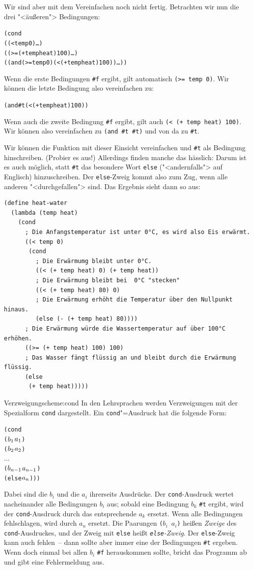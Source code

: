 Wir sind aber mit dem Vereinfachen noch nicht fertig. Betrachten wir
nun die drei "<äußeren"> Bedingungen:
%
\begin{alltt}
    (cond
      ((< temp 0) \ldots)
      ((>= (+ temp heat) 100) \ldots)
      ((and (>= temp 0) (< (+ temp heat) 100)) \ldots))
\end{alltt}
%
Wenn die erste Bedingungen \verb|#f| ergibt, gilt automatisch
\texttt{(>= temp 0)}.  Wir können die letzte Bedingung also
vereinfachen zu:
%
\begin{alltt}
(and #t (< (+ temp heat) 100))
\end{alltt}
%
Wenn auch die zweite Bedingung \verb|#f| ergibt, gilt auch \texttt{(<
  (+ temp heat) 100)}.  Wir können also vereinfachen zu \texttt{(and
  \#t \#t)} und von da zu \verb|#t|.

Wir können die Funktion mit dieser Einsicht vereinfachen und \verb|#t|
als Bedingung hinschreiben.  (Probier es aus!)  Allerdings finden
manche das hässlich: Darum ist es auch möglich, statt \verb|#t| das
besondere Wort \texttt{else}
("<andernfalls"> auf Englisch) hinzuschreiben.
Der \texttt{else}-Zweig kommt also zum Zug, wenn alle anderen
"<durchgefallen"> sind.  Das Ergebnis sieht
dann so aus:
%
\begin{verbatim}
(define heat-water
  (lambda (temp heat)
    (cond
      ; Die Anfangstemperatur ist unter 0°C, es wird also Eis erwärmt.
      ((< temp 0)
       (cond
         ; Die Erwärmumg bleibt unter 0°C.
         ((< (+ temp heat) 0) (+ temp heat))
         ; Die Erwärmung bleibt bei  0°C "stecken"
         ((< (+ temp heat) 80) 0)
         ; Die Erwärmung erhöht die Temperatur über den Nullpunkt hinaus.
         (else (- (+ temp heat) 80))))
      ; Die Erwärmung würde die Wassertemperatur auf über 100°C erhöhen.
      ((>= (+ temp heat) 100) 100)
      ; Das Wasser fängt flüssig an und bleibt durch die Erwärmung flüssig.
      (else
       (+ temp heat)))))
\end{verbatim}
%
\begin{feature}{Verzweigung}{scheme:cond}
In den Lehrsprachen werden Verzweigungen
mit der Spezialform \texttt{cond} dargestellt.
Ein \texttt{cond}"=Ausdruck hat die folgende Form:
%
\begin{alltt}
(cond
  (\(b\sb{1}\) \(a\sb{1}\))
  (\(b\sb{2}\) \(a\sb{2}\))
  \(\ldots\)
  (\(b\sb{n-1}\) \(a\sb{n-1}\))
  (else \(a\sb{n}\))))
\end{alltt}
%
Dabei sind die $b_i$ und die $a_i$ ihrerseits Ausdrücke.  Der
\texttt{cond}-Ausdruck wertet nacheinander alle Bedingungen $b_i$ aus;
sobald eine Bedingung $b_k$ \texttt{\#t} ergibt, wird der
\texttt{cond}-Ausdruck durch das entsprechende $a_k$ ersetzt.  Wenn
alle Bedingungen fehlschlagen, wird durch $a_n$ ersetzt.  Die Paarungen
\texttt{($b_i$ $a_i$)} heißen \textit{Zweige} des
\texttt{cond}-Ausdruckes, und der Zweig mit \texttt{else}  heißt
\textit{\texttt{else}-Zweig}.
Der \texttt{else}-Zweig kann auch fehlen~-- dann sollte aber immer
eine der Bedingungen  \texttt{\#t} ergeben.  Wenn doch einmal bei allen
$b_i$ \verb|#f| herauskommen sollte, bricht \drscheme{} das Programm ab
und gibt eine Fehlermeldung aus.
\end{feature}
